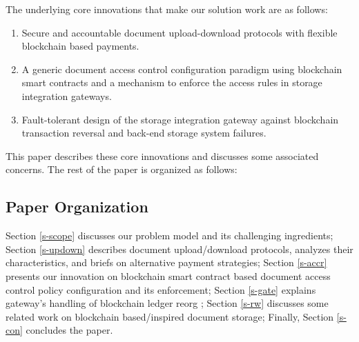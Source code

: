 The underlying core innovations that make our solution work are as follows:
\begin{enumerate}
\item Secure and accountable document upload-download protocols with flexible blockchain based payments.
\item A generic document access control configuration paradigm using blockchain smart contracts and a mechanism to enforce the access rules in storage integration gateways.
\item Fault-tolerant design of the storage integration gateway against blockchain transaction reversal and back-end storage system failures.   
\end{enumerate}         
This paper describes these core innovations and discusses some associated concerns. The rest of the paper is organized as follows:

\subsection{Paper Organization}
Section \ref{s-scope} discusses our problem model and its challenging ingredients; Section \ref{s-updown} describes document upload/download protocols, analyzes their characteristics, and briefs on alternative payment strategies; Section \ref{s-accr} presents our innovation on blockchain smart contract based document access control policy configuration and its enforcement; Section \ref{s-gate} explains gateway's handling of blockchain ledger reorg \cite{reorg}; Section \ref{s-rw} discusses some related work on blockchain based/inspired document storage; Finally, Section \ref{s-con} concludes the paper.
